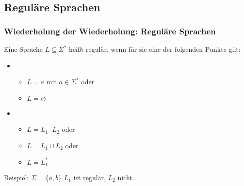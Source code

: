 \documentclass{beamer}
\begin{document}
\subsection{Reguläre Sprachen}
\begin{frame}
 \frametitle{Wiederholung der Wiederholung: Reguläre Sprachen}
        Eine Sprache \(L\subseteq\Sigma^*\) heißt regulär, wenn für sie eine der folgenden Punkte gilt:

\begin{itemize}
\item \begin{itemize}Verankerung
\item \(L = {a}\) mit \(a\in\Sigma^*\) oder
\item \(L = \varnothing \)
\end{itemize}
\item \begin{itemize}Induktion: Seien \(L_1\), \(L_2\) reguläre Sprachen
      \item \(L = L_1 \cdot L_2\) oder
      \item \(L = L_1 \cup L_2\) oder
      \item \(L = L_1^*\)
      \end{itemize}

\end{itemize}
Beispiel:
\(\Sigma = \{a,b\}\)
	\(L_1\) ist regulär, \(L_2\) nicht.
\end{frame}
\end{document}
